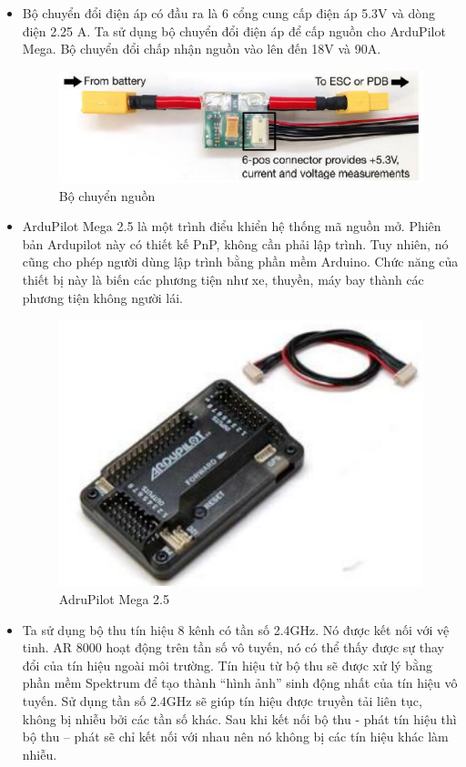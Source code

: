 \begin{itemize}
\item Bộ chuyển đổi điện áp có đầu ra là 6 cổng cung cấp điện áp 5.3V và dòng điện 2.25 A. Ta sử dụng bộ chuyển đổi điện áp để cấp nguồn cho ArduPilot Mega. Bộ chuyển đổi chấp nhận nguồn vào lên đến 18V và 90A.
\begin{figure}[h!]
	        	\begin{center}
	        		\includegraphics[scale=0.8]{images/Cuong-PowerModule.png}
	        		\caption{Bộ chuyển nguồn}
	        	\end{center}
        \end{figure}
\item ArduPilot Mega 2.5 là một trình điểu khiển hệ thống mã nguồn mở. Phiên bản Ardupilot này có thiết kế PnP, không cần phải lập trình. Tuy nhiên, nó cũng cho phép người dùng lập trình bằng phần mềm Arduino. Chức năng của thiết bị này là biến các phương tiện như xe, thuyền, máy bay thành các phương tiện không người lái.
\begin{figure}[h!]
	        	\begin{center}
	        		\includegraphics[scale=0.8]{images/Cuong-Adrupilot.png}
	        		\caption{AdruPilot Mega 2.5}
	        	\end{center}
        \end{figure}
\item Ta sử dụng bộ thu tín hiệu 8 kênh có tần số 2.4GHz. Nó được kết nối với vệ tinh. AR 8000 hoạt động trên tần số vô tuyến, nó có thể thấy được sự thay đổi của tín hiệu ngoài môi trường. Tín hiệu từ bộ thu sẽ được xử lý bằng phần mềm Spektrum để tạo thành “hình ảnh” sinh động nhất của tín hiệu vô tuyến. Sử dụng tần số 2.4GHz sẽ giúp tín hiệu được truyền tải liên tục, không bị nhiễu bởi các tần số khác. Sau khi kết nối bộ thu - phát tín hiệu thì bộ thu – phát sẽ chỉ kết nối với nhau nên nó không bị các tín hiệu khác làm nhiễu.

\end{itemize}
